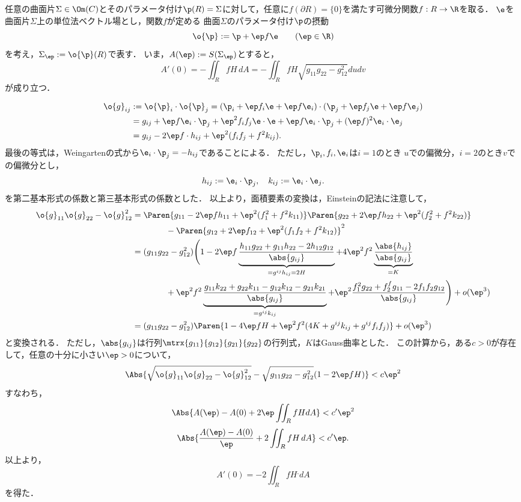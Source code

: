 \documentclass[uplatex,dvipdfmx]{jsreport}
\begin{document}
\begin{lemma}
    任意の曲面片$\Sigma\in\Om(C)$とそのパラメータ付け$\p(R)=\Sigma$に対して，任意に$f(\partial R)=\{0\}$を満たす可微分関数$f:R\to\R$を取る．
    $\e$を曲面片$\Sigma$上の単位法ベクトル場とし，関数$f$が定める
    曲面$\Sigma$のパラメータ付け$\p$の摂動
    \[\o{\p}:=\p+\ep f\e\qquad(\ep\in\R)\]
    を考え，$\Sigma_\ep:=\o{\p}(R)$で表す．
    いま，$A(\ep):=S(\Sigma_\ep)$とすると，
    \[A'(0)=-\iint_RfH\,dA=-\iint_RfH\sqrt{g_{11}g_{22}-g_{12}^2}dudv\]
    が成り立つ．
\end{lemma}
\begin{Proof}
    \begin{align*}
        \o{g}_{ij}&:=\o{\p}_i\cdot\o{\p}_j=(\p_i+\ep f_i\e+\ep f\e_i)\cdot(\p_j+\ep f_j\e+\ep f\e_j)\\
        &=g_{ij}+\ep f\e_i\cdot\p_j+\ep^2f_if_j\e\cdot\e+\ep f\e_i\cdot\p_j+(\ep f)^2\e_i\cdot\e_j\\
        &=g_{ij}-2\ep f\cdot h_{ij}+\ep^2(f_if_j+f^2k_{ij}).
    \end{align*}
    最後の等式は，Weingartenの式から$\e_i\cdot\p_j=-h_{ij}$であることによる．
    ただし，$\p_i,f_i,\e_i$は$i=1$のとき
    $u$での偏微分，$i=2$のとき$v$での偏微分とし，
    \[h_{ij}:=\e_i\cdot\p_j,\quad k_{ij}:=\e_i\cdot\e_j.\]
    を第二基本形式の係数と第三基本形式の係数とした．
    以上より，面積要素の変換は，Einsteinの記法に注意して，
    \begin{align*}
        \o{g}_{11}\o{g}_{22}-\o{g}_{12}^2&=\Paren{g_{11}-2\ep fh_{11}+\ep^2(f_1^2+f^2k_{11})}\Paren{g_{22}+2\ep fh_{22}+\ep^2(f^2_2+f^2k_{22})}\\
        &\qquad\qquad-\Paren{g_{12}+2\ep f_{12}+\ep^2(f_1f_2+f^2k_{12})}^2\\
        &=(g_{11}g_{22}-g_{12}^2)\Biggl(1 - 2\ep f\underbrace{\frac{h_{11}g_{22}+g_{11}h_{22}-2h_{12}g_{12}}{\abs{g_{ij}}}}_{=g^{ij}h_{ij}=2H} +4 \ep^2f^2\underbrace{\frac{\abs{h_{ij}}}{\abs{g_{ij}}}}_{=K}\\
        &\qquad\qquad+\ep^2f^2\underbrace{\frac{g_{11}k_{22}+g_{22}k_{11}-g_{12}k_{12}-g_{21}k_{21}}{\abs{g_{ij}}}}_{=g^{ij}k_{ij}}+\ep^2\frac{f_1^2g_{22}+f_2^fg_{11}-2f_1f_2g_{12}}{\abs{g_{ij}}}\Biggr)+o(\ep^3)\\
        &=(g_{11}g_{22}-g_{12}^2)\Paren{1-4\ep fH+\ep^2f^2(4K+g^{ij}k_{ij}+g^{ij}f_if_j)}+o(\ep^3)
    \end{align*}
    と変換される．
    ただし，$\abs{g_{ij}}$は行列$\mtrx{g_{11}}{g_{12}}{g_{21}}{g_{22}}$の行列式，$K$はGauss曲率とした．
    この計算から，ある$c>0$が存在して，任意の十分に小さい$\ep>0$について，
    \[\Abs{\sqrt{\o{g}_{11}\o{g}_{22}-\o{g}_{12}^2}-\sqrt{g_{11}g_{22}-g_{12}^2}(1-2\ep fH)}<c\ep^2\]
    すなわち，
    \[\Abs{A(\ep)-A(0)+2\ep\iint_RfHdA}<c'\ep^2\]
    \[\Abs{\frac{A(\ep)-A(0)}{\ep}+2\iint_RfH\,dA}<c'\ep.\]
    以上より，
    \[A'(0)=-2\iint_RfH^,dA\]
    を得た．
\end{Proof}
\end{document}
